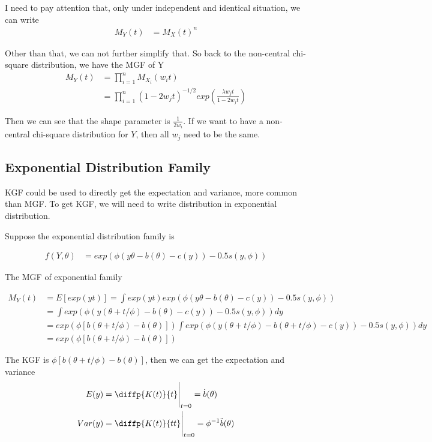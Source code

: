 I need to pay attention that, only under independent and identical situation, we can write
 \begin{align*}
 	M_Y(t) &= M_{X}(t)^n
 \end{align*}

Other than that, we can not further simplify that. So back to the non-central chi-square distribution, we have the MGF of Y
\begin{align*}
	M_Y(t) &= \prod_{i=1}^n M_{X_i}(w_i t)\\
	&=\prod_{i=1}^n  (1-2 w_jt)^{-1/2} exp \left( \frac{ \lambda w_j t }{1-2 w_j t} \right)
\end{align*}

Then we can see that the shape parameter is $\frac{1}{2 w_i}$. If we want to have a non-central chi-square distribution for $Y$, then all $w_j$ need to be the same. 


\subsection{Exponential Distribution Family}

KGF could be used to directly get the expectation and variance, more common than MGF. To get KGF, we will need to write distribution in exponential distribution.

Suppose the exponential distribution family is 

\begin{align*}
	f(Y, \theta) &= exp\left( \phi (y \theta - b(\theta) -c(y)) - 0.5s(y, \phi) \right)
\end{align*}

The MGF of exponential family

\begin{align*}
	M_Y(t) &= E[ exp(yt)] = \int exp(yt) exp\left( \phi (y \theta - b(\theta) -c(y)) - 0.5s(y, \phi) \right) \\
	&= \int  exp \left( \phi (y (\theta + t/\phi) - b(\theta) -c(y)) - 0.5s(y, \phi) \right) dy\\
	&= exp(\phi [b(\theta + t/\phi) - b(\theta)]) \int  exp\left( \phi (y (\theta + t/\phi) - b(\theta + t/\phi) -c(y)) - 0.5s(y, \phi) \right) dy\\
	&= exp(\phi [b(\theta + t/\phi) - b(\theta)]) 
\end{align*}

The KGF is $\phi [b(\theta + t/\phi) - b(\theta)]$, then we can get the expectation and variance
\begin{align*}
	E(y) &= \diffp{K(t)}{t} \Bigg |_{t=0} = \dot{b}(\theta)\\
	Var(y) &= \diffp{K(t)}{t t} \Bigg |_{t=0} = \phi^{-1} \ddot{b}(\theta)
\end{align*}

